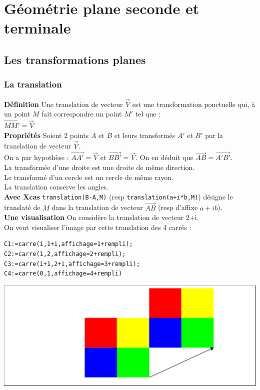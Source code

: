 \documentclass[a4paper,11pt]{book}
\begin{document}
\chapter{G\'eom\'etrie plane seconde et terminale}
\section{Les transformations planes}
\subsection{La translation}
{\bf D\'efinition}
Une translation de vecteur $\overrightarrow{V}$ est une transformation 
ponctuelle qui, \`a un point $M$ fait correspondre un point $M'$ tel que :\\
$\overrightarrow{MM'}=\overrightarrow{V}$\\
{\bf Propri\'et\'es}
Soient 2 points $A$ et $B$ et leurs transform\'es $A'$ et $B'$ par la 
translation de vecteur $\overrightarrow{V}$.\\
On a par hypoth\`ese :
$\overrightarrow{AA'}=\overrightarrow{V}$ et $\overrightarrow{BB'}=\overrightarrow{V}$.
On en d\'eduit que $\overrightarrow{AB}=\overrightarrow{A'B'}$.\\
La transform\'ee d'une droite est une droite de m\^eme direction.\\
Le transform\'e d'un cercle est un cercle de m\^eme rayon.\\
La translation conserve les angles.\\
{\bf Avec Xcas}
{\tt translation(B-A,M)} (resp {\tt translation(a+i*b,M)}) d\'esigne le 
translat\'e de $M$ dans la translation de vecteur $\overrightarrow{AB}$ (resp 
d'affixe $a+ib$).\\
{\bf Une visualisation}
On consid\`ere la translation de vecteur 2+i.\\
On veut visualiser l'image par cette translation des 4 carr\'es :
\begin{verbatim}
C1:=carre(i,1+i,affichage=1+rempli);
C2:=carre(1,2,affichage=2+rempli);
C3:=carre(i+1,2+i,affichage=3+rempli);
C4:=carre(0,1,affichage=4+rempli)
\end{verbatim}
\includegraphics[width=\textwidth]{damiertrans1}\\
\end{document}

